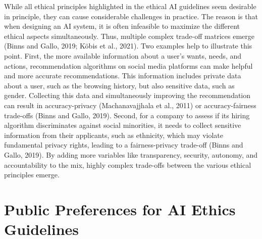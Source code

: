 \documentclass{article}
\begin{document}
While all ethical principles highlighted in the ethical AI guidelines
seem desirable in principle, they can cause considerable challenges in
practice. The reason is that when designing an AI system, it is often
infeasible to maximize the different ethical aspects simultaneously.
Thus, multiple complex trade-off matrices emerge (Binns and Gallo, 2019;
Köbis et al., 2021). Two examples help to illustrate this point. First,
the more available information about a user's wants, needs, and actions,
recommendation algorithms on social media platforms can make helpful and
more accurate recommendations. This information includes private data
about a user, such as the browsing history, but also sensitive data,
such as gender. Collecting this data and simultaneously improving the
recommendation can result in accuracy-privacy (Machanavajjhala et al.,
2011) or accuracy-fairness trade-offs (Binns and Gallo, 2019). Second,
for a company to assess if its hiring algorithm discriminates against
social minorities, it needs to collect sensitive information from their
applicants, such as ethnicity, which may violate fundamental privacy
rights, leading to a fairness-privacy trade-off (Binns and Gallo, 2019).
By adding more variables like transparency, security, autonomy, and
accountability to the mix, highly complex trade-offs between the various
ethical principles emerge.

\hypertarget{public-preferences-for-ai-ethics-guidelines}{%
\section{Public Preferences for AI Ethics
Guidelines}\label{public-preferences-for-ai-ethics-guidelines}}
\end{document}
